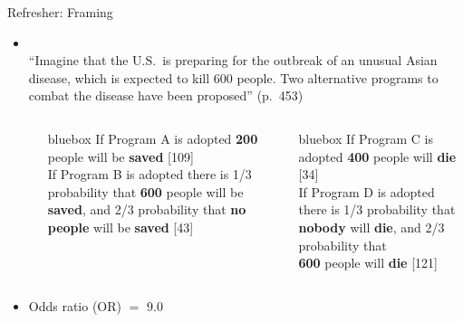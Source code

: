 \documentclass[aspectratio=169]{beamer}
\newenvironment{colbox}[1][\textwidth]%
  {\begin{beamercolorbox}[wd=#1, rounded=true, shadow=true]{bluebox}}
  {\end{beamercolorbox}}
\begin{document}
%


\begin{frame}{Refresher: Framing}

\begin{itemize}
\item \citet{ TverskyKahneman81}\\[1ex]

``Imagine that the U.S.\ is preparing for the outbreak of an unusual Asian
disease, which is expected to kill 600 people. Two alternative programs to
combat the disease have been proposed'' (p.~453)\\[1ex]

\begin{columns}
\begin{column}{0.4 cm}
\end{column}
%
\begin{column}{5.8 cm}
\begin{colbox}
If Program A is adopted \textbf{200} people will be \textbf{saved} [109]\\[2ex]

If Program B is adopted there is 1/3 probability that \textbf{600} people
will be \textbf{saved}, and 2/3 probability that \textbf{no people} will be
\textbf{saved} [43]
\end{colbox}
\end{column}
%
\begin{column}{5.8 cm}
\begin{colbox}
If Program C is adopted \textbf{400} people will
\textbf{die} [34]\\[2ex]

If Program D is adopted there is 1/3 probability that \textbf{nobody} will
\textbf{die}, and 2/3 probability that\\
\textbf{600} people will \textbf{die} [121]
\end{colbox}
\end{column}
\end{columns}

\vspace{2ex}

\item Odds ratio (OR) $=$ 9.0
\end{itemize}
\end{frame}
\end{document}
